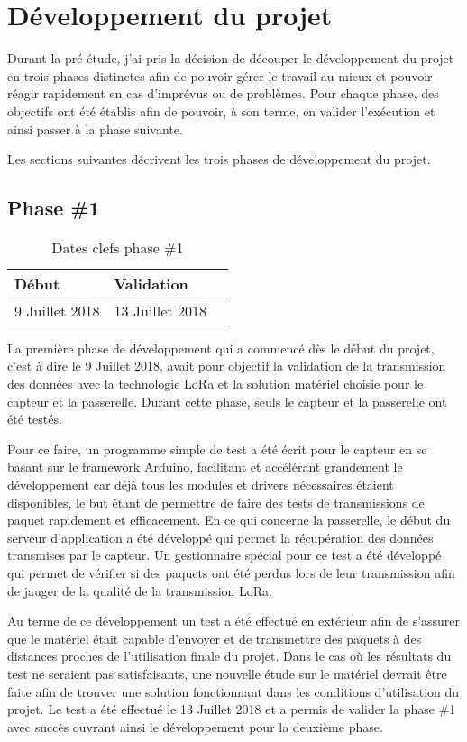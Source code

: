 
\chapter{Développement du projet}\label{ch:developpement}

Durant la pré-étude, j'ai pris la décision de découper le développement du projet en trois phases distinctes afin de pouvoir gérer le travail au mieux et pouvoir réagir rapidement en cas d'imprévus ou de problèmes. Pour chaque phase, des objectifs ont été établis afin de pouvoir, à son terme, en valider l'exécution et ainsi passer à la phase suivante.

Les sections suivantes décrivent les trois phases de développement du projet.

\section{Phase \#1}

\begin{table}[htb]
\caption{Dates clefs phase \#1}
\label{tab:detail_phase_1}
\centering
\begin{tabular}{ l l l }
\toprule
Début & Validation \\
\midrule
9 Juillet 2018 & 13 Juillet 2018  \\
\bottomrule 
\end{tabular}
\end{table}

La première phase de développement qui a commencé dès le début du projet, c'est à dire le 9 Juillet 2018, avait pour objectif la validation de la transmission des données avec la technologie LoRa et la solution matériel choisie pour le capteur et la passerelle. Durant cette phase, seuls le capteur et la passerelle ont été testés. 

Pour ce faire, un programme simple de test a été écrit pour le capteur en se basant sur le framework Arduino, facilitant et accélérant grandement le développement car déjà tous les modules et drivers nécessaires étaient disponibles, le but étant de permettre de faire des tests de transmissions de paquet rapidement et efficacement. En ce qui concerne la passerelle, le début du serveur d'application a été développé qui permet la récupération des données transmises par le capteur. Un gestionnaire spécial pour ce test a été développé qui permet de vérifier si des paquets ont été perdus lors de leur transmission afin de jauger de la qualité de la transmission LoRa.

Au terme de ce développement un test a été effectué en extérieur afin de s'assurer que le matériel était capable d'envoyer et de transmettre des paquets à des distances proches de l'utilisation finale du projet. Dans le cas où les résultats du test ne seraient pas satisfaisants, une nouvelle étude sur le matériel devrait être faite afin de trouver une solution fonctionnant dans les conditions d'utilisation du projet. Le test a été effectué le 13 Juillet 2018 et a permis de valider la phase \#1 avec succès ouvrant ainsi le développement pour la deuxième phase.

